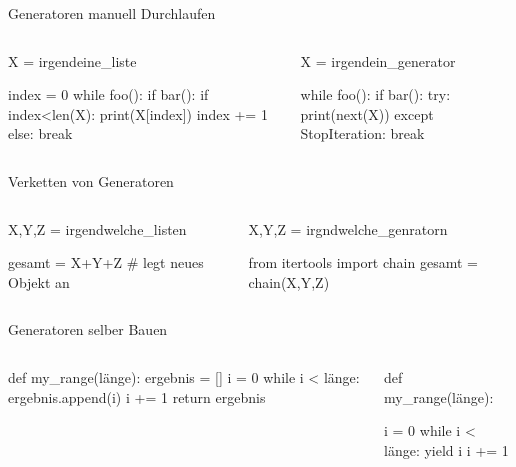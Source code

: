 \documentclass[xcolor=dvipsnames, aspectratio=169, 14pt]{beamer}
\begin{document}
\begin{frame}[fragile]{Generatoren manuell Durchlaufen}
	\begin{columns}%
	\vspace{-\baselineskip}
	\begin{python3code}
	X = irgendeine_liste
	
	index = 0
	while foo():
		if bar():
			if index<len(X):
				print(X[index])
				index += 1
			else:
				break
	\end{python3code}
	
	\vspace{-\baselineskip}
	\begin{python3code}
	X = irgendein_generator
	
	while foo():
		if bar():
			try:
				print(next(X))
			except StopIteration:
				break
	\end{python3code}
	\end{columns}
\end{frame}

\begin{frame}[fragile]{Verketten von Generatoren}
	\begin{columns}%
	\column{0.5\linewidth}
	\vspace{-\baselineskip}
	\begin{python3code}
	X,Y,Z = irgendwelche_listen
	
	gesamt = X+Y+Z
	# legt neues Objekt an
	\end{python3code}
	
	\column{0.5\linewidth}
	\vspace{-\baselineskip}
	\begin{python3code}
	X,Y,Z = irgndwelche_genratorn
	
	from itertools import chain
	gesamt = chain(X,Y,Z)
	\end{python3code}
	\end{columns}
\end{frame}

\begin{frame}[fragile]{Generatoren selber Bauen}
	\begin{columns}%
	\vspace{-\baselineskip}
	\begin{python3code}
	def my_range(länge):
		ergebnis = []
		i = 0
		while i < länge:
			ergebnis.append(i)
			i += 1
		return ergebnis
	\end{python3code}
	
	\vspace{-\baselineskip}
	\begin{python3code}
	def my_range(länge):
		
		i = 0
		while i < länge:
			yield i
			i += 1
		
	\end{python3code}
	\end{columns}
\end{frame}
\end{document}
